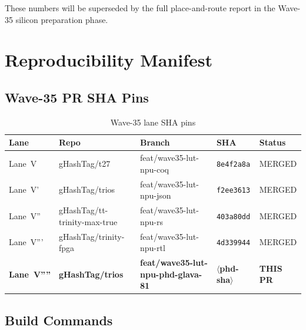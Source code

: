 These numbers will be superseded by the full place-and-route report in the
Wave-35 silicon preparation phase.

\section{Reproducibility Manifest}
\label{app:reproducibility}

\subsection{Wave-35 PR SHA Pins}

\begin{table}[ht]
\centering
\caption{Wave-35 lane SHA pins}
\label{tab:sha_pins}
\begin{tabular}{lllll}
\hline
Lane & Repo & Branch & SHA & Status \\
\hline
Lane~V   & gHashTag/t27             & feat/wave35-lut-npu-coq   & \texttt{8e4f2a8a}   & MERGED \cite{coq_lut_npu_t27_651} \\
Lane~V'  & gHashTag/trios           & feat/wave35-lut-npu-json  & \texttt{f2ee3613}   & MERGED \cite{assertions_w35_trios_859} \\
Lane~V'' & gHashTag/tt-trinity-max-true & feat/wave35-lut-npu-rs & \texttt{403a80dd}  & MERGED \cite{rust_witness_w104a_max_true_21} \\
Lane~V''' & gHashTag/trinity-fpga   & feat/wave35-lut-npu-rtl   & \texttt{4d339944}   & MERGED \cite{rtl_lut_npu_trinity_fpga_124} \\
\textbf{Lane~V''''} & \textbf{gHashTag/trios} & \textbf{feat/wave35-lut-npu-phd-glava-81} & \textbf{$\langle$phd-sha$\rangle$} & \textbf{THIS PR} \\
\hline
\end{tabular}
\end{table}

\subsection{Build Commands}

